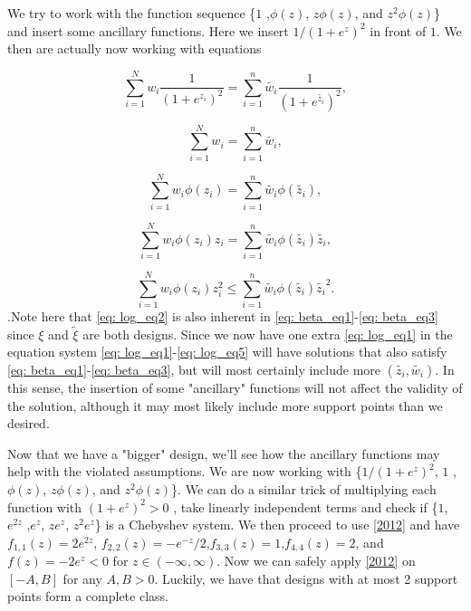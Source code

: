 \documentclass[11pt]{amsart}
\theoremstyle{definition}
\theoremstyle{remark}
\begin{document}
 We try to work with the function sequence \{$1$ ,$\phi(z)$, $z\phi(z)$, and $z^2\phi(z)$\} and insert some ancillary functions. Here we insert $1/(1+e^z)^2$ in front of $1$. We then are actually now working with equations 
 
\begin{equation}\label{eq: log_eq1}
\sum_{i=1}^{N} w_i \frac{1}{(1+e^{z_i})^2} = \sum_{i=1}^{n} \tilde{w_i}  \frac{1}{(1+e^{\tilde{z_i}})^2} ,
\end{equation}

\begin{equation}\label{eq: log_eq2}
\sum_{i=1}^{N} w_i  = \sum_{i=1}^{n} \tilde{w_i}  ,
\end{equation}

\begin{equation}\label{eq: log_eq3}
\sum_{i=1}^{N} w_i \phi(z_i) = \sum_{i=1}^{n} \tilde{w_i}  \phi(\tilde{z_i}) ,
\end{equation}

\begin{equation}\label{eq: log_eq4}
\sum_{i=1}^{N} w_i  \phi(z_i)z_i = \sum_{i=1}^{n} \tilde{w_i} \phi(\tilde{z_i}) \tilde{z_i},
\end{equation}

\begin{equation}\label{eq: log_eq5}
\sum_{i=1}^{N} w_i \phi(z_i)z_i^2 \le \sum_{i=1}^{n} \tilde{w_i}\phi(\tilde{z_i})\tilde{z_i}^2.
\end{equation}.Note here that \ref{eq: log_eq2} is also inherent in \ref{eq: beta_eq1}-\ref{eq: beta_eq3} since $\xi$ and $\tilde{\xi}$ are both designs. Since we now have one extra \ref{eq: log_eq1} in the equation system \ref{eq: log_eq1}-\ref{eq: log_eq5} will have solutions that also satisfy \ref{eq: beta_eq1}-\ref{eq: beta_eq3}, but will most certainly include more $(\tilde{z_i},\tilde{w_i})$. In this sense, the insertion of some  "ancillary" functions will not affect the validity of the solution, although it may most likely include more support points than we desired.

Now that we have a "bigger" design, we'll see how the ancillary functions may help with the violated assumptions. We are now working with \{$1/(1+e^z)^2$, $1$ ,$\phi(z)$, $z\phi(z)$, and $z^2\phi(z)$\}. We can do a similar trick of multiplying each function with $(1+e^z)^2>0$ , take linearly independent terms and check if  \{$1$, $e^{2z}$ ,$e^z$, $ze^z$, $z^2e^z$\} is a Chebyshev system. We then proceed to use \ref{2012} and have $f_{1,1}(z) = 2e^{2z}$, $f_{2,2}(z) = -e^{-z}/2$,$f_{3,3}(z) = 1$,$f_{4,4}(z) = 2$, and $f(z) = -2e^z<0$ for $z\in(-\infty,\infty)$. Now we can safely apply \ref{2012} on $[-A,B]$ for any  $A,B>0$. Luckily, we have that designs with at most 2 support points form a complete class. \\
\end{document}
